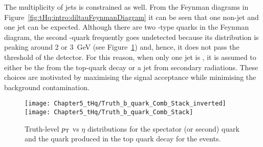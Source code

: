 The multiplicity of jets is constrained as well. From the Feynman diagrams 
in Figure~\ref{fig:tHq:intro:diltauFeynmanDiagram} it
can be seen that one non-\btagged jet and one \btagged jet can be expected. 
Although there are two \Pbottom-type quarks in the Feynman diagram,
the second%
 \Pbottom-quark frequently goes undetected because its
\pT distribution is peaking around 2 or 3~GeV 
(see Figure~\ref{fig:tHq:pTvsEta_bQuark}) and, hence, it does
not pass the \pT threshold of the detector. 
For this reason, when only one jet is \btagged, 
it is assumed to either be the \Pbottom from the top-quark decay or a jet from secondary radiations.
These choices are motivated by maximising the signal acceptance while minimising the background contamination.

\begin{figure}[h]
\centering
\texttt{[image: Chapter5\_tHq/Truth\_b\_quark\_Comb\_Stack\_inverted]}
\texttt{[image: Chapter5\_tHq/Truth\_b\_quark\_Comb\_Stack]}

\caption{Truth-level $p_{\text{T}}$ vs $\eta$ distributions for the spectator (or second) \Pbottom quark and 
the \Pbottom quark produced in the top quark decay for the \tHq events.
}
\label{fig:tHq:pTvsEta_bQuark}
\end{figure}

